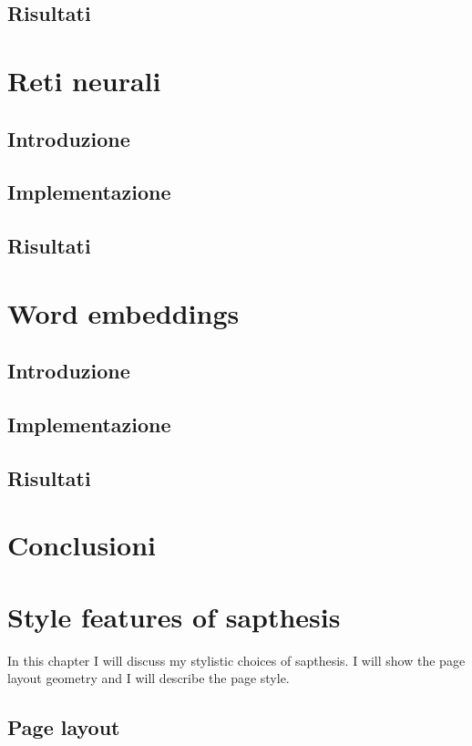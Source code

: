 \documentclass[Lau,binding=0.6cm]{sapthesis}
\begin{document}
\section{Risultati}

\chapter{Reti neurali}

\section{Introduzione}
\section{Implementazione}
\section{Risultati}

\chapter{Word embeddings}

\section{Introduzione}
\section{Implementazione}
\section{Risultati}

\chapter{Conclusioni}










\chapter{Style features of \textsf{sapthesis}}
In this chapter I will discuss my stylistic choices of \textsf{sapthesis}.
I will show the page layout geometry and I will describe the page style.
\section{Page layout}
\end{document}
